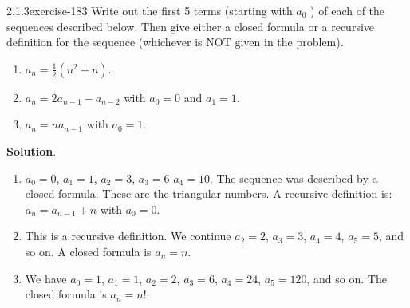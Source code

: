 \documentclass[twoside,11pt,]{book}
\numberwithin{equation}{chapter}
\begin{document}
\begin{divisionsolution}{2.1.3}{}{exercise-183}%
\hypertarget{p-3007}{}%
Write out the first 5 terms (starting with \(a_0\) ) of each of the sequences described below. Then give either a closed formula or a recursive definition for the sequence (whichever is NOT given in the problem).\leavevmode%
\begin{enumerate}[label=(\alph*)]
\item\hypertarget{li-1764}{}\hypertarget{p-3008}{}%
\(a_n = \frac{1}{2}(n^2 + n)\).%
\item\hypertarget{li-1765}{}\hypertarget{p-3009}{}%
\(a_n = 2a_{n-1} - a_{n-2}\) with \(a_0 = 0\) and \(a_1 = 1\).%
\item\hypertarget{li-1766}{}\hypertarget{p-3010}{}%
\(a_n = na_{n-1}\) with \(a_0 = 1\).%
\end{enumerate}
%
\par\smallskip%
\noindent\textbf{Solution}.\quad%
\hypertarget{p-3011}{}%
\leavevmode%
\begin{enumerate}[label=(\alph*)]
\item\hypertarget{li-1767}{}\hypertarget{p-3012}{}%
\(a_0 = 0\), \(a_1 = 1\), \(a_2 = 3\), \(a_3 = 6\) \(a_4 = 10\). The sequence was described by a closed formula. These are the triangular numbers. A recursive definition is: \(a_n = a_{n-1} + n\) with \(a_0 = 0\).%
\item\hypertarget{li-1768}{}\hypertarget{p-3013}{}%
This is a recursive definition. We continue \(a_2 = 2\), \(a_3 = 3\), \(a_4 = 4\), \(a_5 = 5\), and so on. A closed formula is \(a_n = n\).%
\item\hypertarget{li-1769}{}\hypertarget{p-3014}{}%
We have \(a_0 = 1\), \(a_1 = 1\), \(a_2 = 2\), \(a_3 = 6\), \(a_4 = 24\), \(a_5 = 120\), and so on. The closed formula is \(a_n = n!\).%
\end{enumerate}
%
\end{divisionsolution}%
\end{document}
